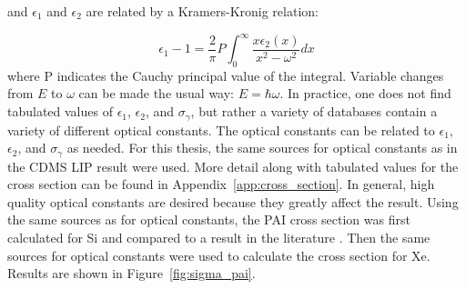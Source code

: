 and $\epsilon_{1}$ and $\epsilon_{2}$ are related by a Kramers-Kronig relation:

\begin{equation}
\epsilon_{1} - 1 = \frac{2}{\pi} P \int_{0}^{\infty} \frac{ x \epsilon_{2}(x)}{x^{2} - \omega^{2}} dx
\end{equation}
where P indicates the Cauchy principal value of the integral. Variable changes from $E$ to $\omega$ can be made the usual way: $E = \hbar \omega$. In practice, one does not find tabulated values of $\epsilon_{1}$, $\epsilon_{2}$, and $\sigma_{\gamma}$, but rather a variety of databases contain a variety of different optical constants. The optical constants can be related to $\epsilon_{1}$, $\epsilon_{2}$, and $\sigma_{\gamma}$ as needed. For this thesis, the same sources for optical constants as in the \ac{CDMS} \ac{LIP} result \cite{Prasad2013} were used. More detail along with tabulated values for the cross section can be found in Appendix~\ref{app:cross_section}. In general, high quality optical constants are desired because they greatly affect the result. Using the same sources as \cite{Prasad2013} for optical constants, the \ac{PAI} cross section was first calculated for Si and compared to a result in the literature \cite{Bichsel:2006}. Then the same sources for optical constants were used to calculate the cross section for Xe. Results are shown in Figure~\ref{fig:sigma_pai}. 


